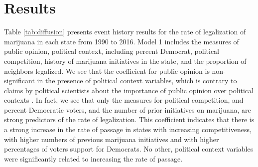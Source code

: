 \section{Results}

Table \ref{tab:diffusion} presents event history results for the rate of legalization of marijuana in each state from 1990 to 2016. Model 1 includes the measures of public opinion, political context, including percent Democrat, political competition, history of marijuana initiatives in the state, and the proportion of neighbors legalized. We see that the coefficient for public opinion is non-significant in the presence of political context variables, which is contrary to claims by political scientists about the importance of public opinion over political contexts \citep{burstein_and_linton_2002}. In fact, we see that only the measures for political competition, and percent Democratic voters, and the number of prior initiatives on marijuana, are strong predictors of the rate of legalization. This coefficient indicates that there is a strong increase in the rate of passage in states with increasing competitiveness, with higher numbers of previous marijuana initiatives and with higher percentages of voters support for Democrats. No other, political context variables were significantly related to increasing the rate of passage. 




%

%




